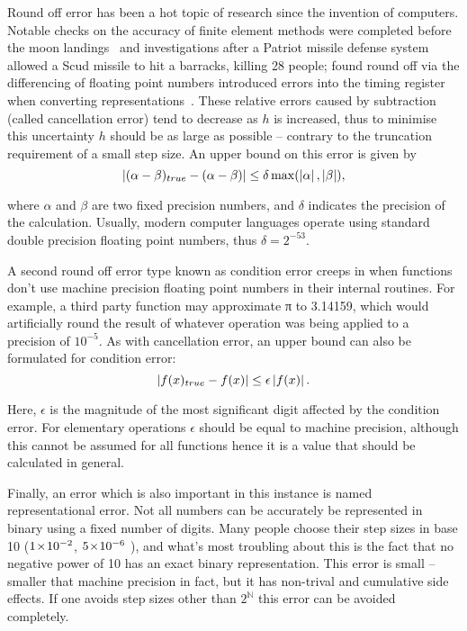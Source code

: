 Round off error has been a hot topic of research since the invention of computers.
Notable checks on the accuracy of finite element methods were completed before the moon landings~\cite{Cyrus1968} and investigations after a Patriot missile defense system allowed a Scud missile to hit a barracks, killing 28 people; found round off via the differencing of floating point numbers introduced errors into the timing register when converting representations~\cite{Skeel1992}.
These relative errors caused by subtraction (called cancellation error) tend to decrease as $h$ is increased, thus to minimise this uncertainty $h$ should be as large as possible -- contrary to the truncation requirement of a small step size.
An upper bound on this error is given by
\begin{equation}
 \left\lvert (\alpha-\beta)_{true} - (\alpha-\beta)\right\rvert \leq \delta \max(\left\lvert \alpha\right\rvert,\left\lvert \beta\right\rvert),
\end{equation}

where $\alpha$ and $\beta$ are two fixed precision numbers, and $\delta$ indicates the precision of the calculation.
Usually, modern computer languages operate using standard double precision floating point numbers, thus $\delta = 2^{-53}$.

A second round off error type known as condition error creeps in when functions don't use machine precision floating point numbers in their internal routines.
For example, a third party function may approximate π to 3.14159, which would artificially round the result of whatever operation was being applied to a precision of $10^{-5}$.
As with cancellation error, an upper bound can also be formulated for condition error:
\begin{equation}
\left\lvert f(x)_{true} - f(x)\right\rvert\leq \epsilon \left\lvert f(x)\right\rvert.
\end{equation}

Here, $\epsilon$ is the magnitude of the most significant digit affected by the condition error.
For elementary operations $\epsilon$ should be equal to machine precision, although this cannot be assumed for all functions hence it is a value that should be calculated in general.

Finally, an error which is also important in this instance is named representational error.
Not all numbers can be accurately be represented in binary using a fixed number of digits.
Many people choose their step sizes in base 10 (\eg $1\!\times\!10^{-2}$, $5\!\times\!10^{-6}$ \etc), and what's most troubling about this is the fact that no negative power of 10 has an exact binary representation.
This error is small -- smaller that machine precision in fact, but it has non-trival and cumulative side effects.
If one avoids step sizes other than $2^\mathds{N}$ this error can be avoided completely.

